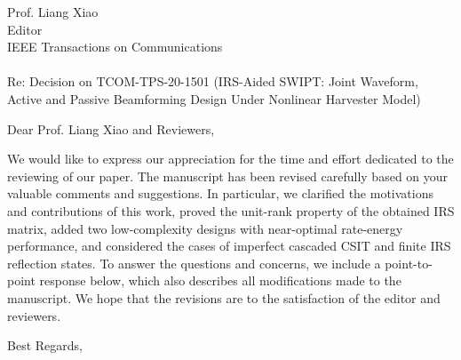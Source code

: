 \documentclass[a4paper, 10pt]{letter}
\date{}
\begin{document}
	\begin{letter}{Prof. Liang Xiao \\ Editor \\ IEEE Transactions on Communications \\ ~ \\ Re: Decision on TCOM-TPS-20-1501 (IRS-Aided SWIPT: Joint Waveform, Active and Passive Beamforming Design Under Nonlinear Harvester Model)}
		\opening{Dear Prof. Liang Xiao and Reviewers,}

		We would like to express our appreciation for the time and effort dedicated to the reviewing of our paper. The manuscript has been revised carefully based on your valuable comments and suggestions. In particular, we clarified the motivations and contributions of this work, proved the unit-rank property of the obtained IRS matrix, added two low-complexity designs with near-optimal rate-energy performance, and considered the cases of imperfect cascaded CSIT and finite IRS reflection states. To answer the questions and concerns, we include a point-to-point response below, which also describes all modifications made to the manuscript. We hope that the revisions are to the satisfaction of the editor and reviewers.

		\closing{Best Regards,}
	\end{letter}
\end{document}
